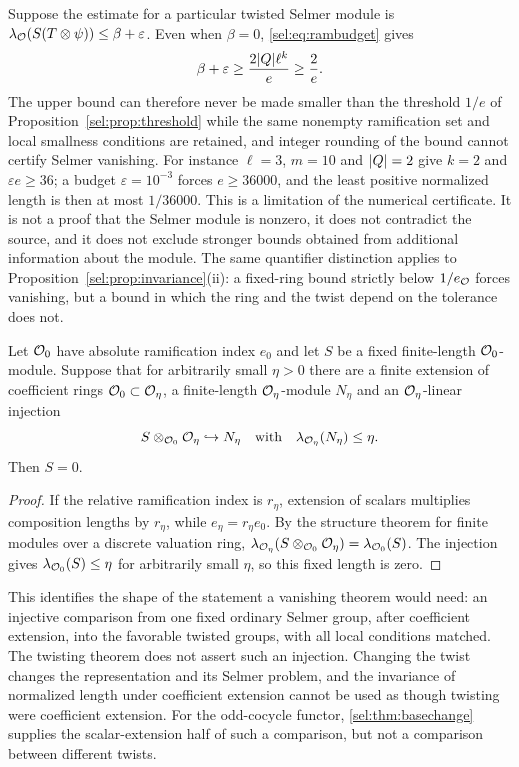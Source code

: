 Suppose the estimate for a particular twisted Selmer module is
$\lambda_{\mathcal{O}}(S(T\otimes\psi))\le\beta+\varepsilon$. Even when $\beta=0$,
\eqref{sel:eq:rambudget} gives
\[
 \beta+\varepsilon\ge\frac{2\lvert Q\rvert\ell^k}{e}\ge\frac2e .
\]
The upper bound can therefore never be made smaller than the threshold
$1/e$ of Proposition~\ref{sel:prop:threshold} while the same nonempty ramification set
and local smallness conditions are retained, and integer rounding of the
bound cannot certify Selmer vanishing. For instance $\ell=3$, $m=10$ and
$\lvert Q\rvert=2$ give $k=2$ and $\varepsilon e\ge36$; a budget
$\varepsilon=10^{-3}$ forces $e\ge36000$, and the least positive normalized
length is then at most $1/36000$. This is a limitation of the numerical
certificate. It is not a proof that the Selmer module is nonzero, it does
not contradict the source, and it does not exclude stronger bounds obtained
from additional information about the module. The same quantifier
distinction applies to Proposition~\ref{sel:prop:invariance}(ii): a fixed-ring bound
strictly below $1/e_{\mathcal{O}}$ forces vanishing, but a bound in which the ring
and the twist depend on the tolerance does not.

\begin{proposition}\label{sel:prop:descent}
Let $\mathcal{O}_0$ have absolute ramification index $e_0$ and let $S$ be a fixed
finite-length $\mathcal{O}_0$-module. Suppose that for arbitrarily small $\eta>0$
there are a finite extension of coefficient rings
$\mathcal{O}_0\subset\mathcal{O}_\eta$, a finite-length $\mathcal{O}_\eta$-module $N_\eta$ and an
$\mathcal{O}_\eta$-linear injection
\[
 S\otimes_{\mathcal{O}_0}\mathcal{O}_\eta\hookrightarrow N_\eta
 \quad\text{with}\quad\lambda_{\mathcal{O}_\eta}(N_\eta)\le\eta .
\]
Then $S=0$.
\end{proposition}

\begin{proof}
If the relative ramification index is $r_\eta$, extension of scalars
multiplies composition lengths by $r_\eta$, while
$e_\eta=r_\eta e_0$. By the structure theorem for finite modules over a
discrete valuation ring,
$\lambda_{\mathcal{O}_\eta}(S\otimes_{\mathcal{O}_0}\mathcal{O}_\eta)=\lambda_{\mathcal{O}_0}(S)$. The
injection gives $\lambda_{\mathcal{O}_0}(S)\le\eta$ for arbitrarily small $\eta$, so
this fixed length is zero.
\end{proof}

This identifies the shape of the statement a vanishing theorem would need:
an injective comparison from one fixed ordinary Selmer group, after
coefficient extension, into the favorable twisted groups, with all local
conditions matched. The twisting theorem does not assert such an injection.
Changing the twist changes the representation and its Selmer problem, and
the invariance of normalized length under coefficient extension cannot be
used as though twisting were coefficient extension. For the odd-cocycle
functor, \cref{sel:thm:basechange} supplies the scalar-extension half of
such a comparison, but not a comparison between different twists.

